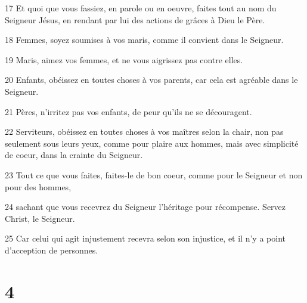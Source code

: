 \par 17 Et quoi que vous fassiez, en parole ou en oeuvre, faites tout au nom du Seigneur Jésus, en rendant par lui des actions de grâces à Dieu le Père.
\par 18 Femmes, soyez soumises à vos maris, comme il convient dans le Seigneur.
\par 19 Maris, aimez vos femmes, et ne vous aigrissez pas contre elles.
\par 20 Enfants, obéissez en toutes choses à vos parents, car cela est agréable dans le Seigneur.
\par 21 Pères, n'irritez pas vos enfants, de peur qu'ils ne se découragent.
\par 22 Serviteurs, obéissez en toutes choses à vos maîtres selon la chair, non pas seulement sous leurs yeux, comme pour plaire aux hommes, mais avec simplicité de coeur, dans la crainte du Seigneur.
\par 23 Tout ce que vous faites, faites-le de bon coeur, comme pour le Seigneur et non pour des hommes,
\par 24 sachant que vous recevrez du Seigneur l'héritage pour récompense. Servez Christ, le Seigneur.
\par 25 Car celui qui agit injustement recevra selon son injustice, et il n'y a point d'acception de personnes.

\chapter{4}

